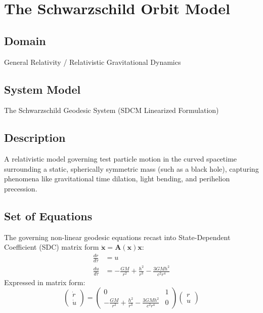 \chapter{The Schwarzschild Orbit Model}

\section{Domain}
General Relativity / Relativistic Gravitational Dynamics

\section{System Model}
The Schwarzschild Geodesic System (SDCM Linearized Formulation)

\section{Description}
A relativistic model governing test particle motion in the curved spacetime surrounding a static, spherically symmetric mass (such as a black hole), capturing phenomena like gravitational time dilation, light bending, and perihelion precession.

\section{Set of Equations}
The governing non-linear geodesic equations recast into State-Dependent Coefficient (SDC) matrix form $\dot{\mathbf{x}} = \mathbf{A}(\mathbf{x})\mathbf{x}$:
\begin{align}
\frac{dr}{d\tau} &= u \\
\frac{du}{d\tau} &= -\frac{GM}{r^2} + \frac{h^2}{r^3} - \frac{3GMh^2}{c^2 r^4}
\end{align}
Expressed in matrix form:
\begin{equation}
\begin{pmatrix} \dot{r} \\ \dot{u} \end{pmatrix} = \begin{pmatrix} 0 & 1 \\ -\frac{GM}{r^2} + \frac{h^2}{r^3} - \frac{3GMh^2}{c^2 r^4} & 0 \end{pmatrix} \begin{pmatrix} r \\ u \end{pmatrix}
\end{equation}

